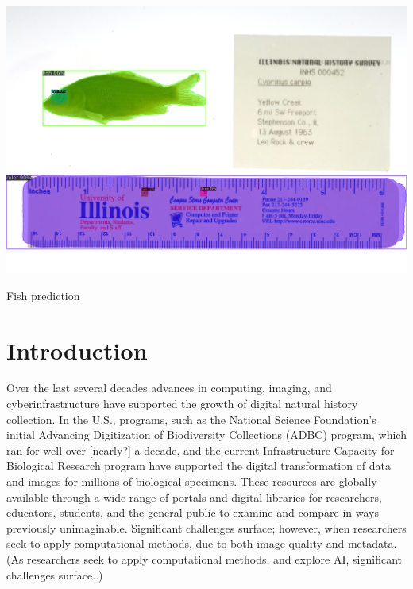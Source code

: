 \documentclass[screen,review]{acmart}
\begin{document}
\begin{teaserfigure}
  \includegraphics[width=\textwidth]{fish}
  \caption{Fish prediction}
  \label{fig:fish}
\end{teaserfigure}

\maketitle

\section{Introduction}


Over the last several decades advances in computing, imaging, and cyberinfrastructure have supported the growth of digital natural history collection. In the U.S., programs, such as the National Science Foundation’s initial Advancing Digitization of Biodiversity Collections (ADBC) program, which ran for well over [nearly?] a decade, and the current Infrastructure Capacity for Biological Research program have supported the digital transformation of data and images for millions of biological specimens. These resources are globally available through a wide range of portals and digital libraries for researchers, educators, students, and the general public to examine and compare in ways previously unimaginable. Significant challenges surface; however, when researchers seek to apply computational methods, due to both image quality and metadata. (As researchers seek to apply computational methods, and explore AI, significant challenges surface..) 
\end{document}
